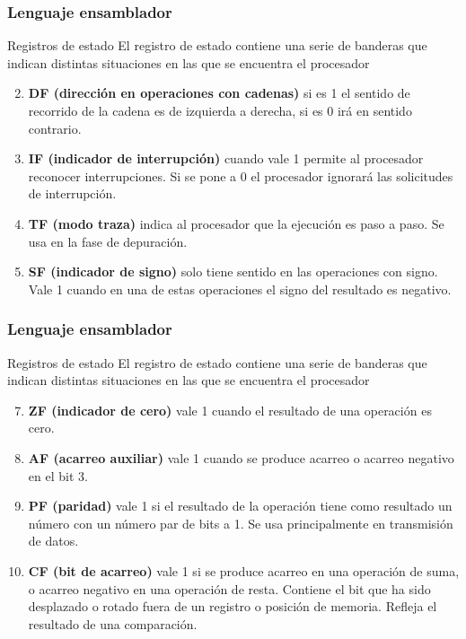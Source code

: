 \documentclass{beamer}
\begin{document}
\begin{frame}
	\frametitle{Lenguaje ensamblador}
	\begin{block}{Registros de estado} \justify
El registro de estado contiene una serie de banderas que indican distintas situaciones en las que
se encuentra el procesador 
	\begin{enumerate}\setcounter{enumi}{1}
		\item \textbf{DF (dirección en operaciones con cadenas)} si es 1 el sentido de recorrido de la cadena es de izquierda a derecha, si es 0 irá en sentido contrario.
		\item \textbf{IF (indicador de interrupción)} cuando vale 1 permite al procesador reconocer interrupciones. Si se pone a 0 el procesador ignorará las solicitudes de interrupción.
		\item \textbf{TF (modo traza)} indica al procesador que la ejecución es paso a paso. Se usa en la fase de depuración.
		\item \textbf{SF (indicador de signo)} solo tiene sentido en las operaciones con signo. Vale 1 cuando en una de estas operaciones el signo del resultado es negativo.
	\end{enumerate}	
	\end{block}			 		
\end{frame}

\begin{frame}
	\frametitle{Lenguaje ensamblador}
	\begin{block}{Registros de estado} \justify
El registro de estado contiene una serie de banderas que indican distintas situaciones en las que se encuentra el procesador 
	\begin{enumerate}\setcounter{enumi}{6}
		\item \textbf{ZF (indicador de cero)} vale 1 cuando el resultado de una operación es cero.
		\item \textbf{AF (acarreo auxiliar)} vale 1 cuando se produce acarreo o acarreo negativo en el bit 3.
		\item \textbf{PF (paridad)} vale 1 si el resultado de la operación tiene como resultado un número con un número
par de bits a 1. Se usa principalmente en transmisión de datos.
		\item \textbf{CF (bit de acarreo)} vale 1 si se produce acarreo en una operación de suma, o acarreo negativo en una operación de resta. Contiene el bit que ha sido desplazado o rotado fuera de un registro o posición de memoria. Refleja el resultado de una comparación. 
	\end{enumerate}	
	\end{block}			 		
\end{frame}
\end{document}
